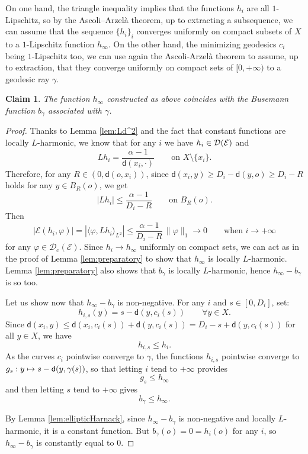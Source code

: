 \documentclass[JEP,XML,SOM,Unicode,published]{cedram}
\newcommand\mto{\mathchoice{\longmapsto}{\mapsto}{\mapsto}{\mapsto}}
\newcommand{\rmc}{\mathrm{c}}
\let\backslash\setminus
\newcommand{\NoChangel}[1]{%
\expandafter\let\csname old\string#1\endcsname=#1
\let#1=\relax
\newcommand{#1}{\mathcode`l="716C\csname old\string#1\endcsname\mathcode`l="7160 }%
}
\theoremstyle{plain}
\newtheorem{claim}[theorem]{Claim}
\theoremstyle{definition}
\newcommand{\cE}{\mathcal{E}}
\newcommand{\cD}{\mathcal{D}}
\let\phi\varphi
\newcommand{\loc}{\mathrm{loc}}\NoChangel{\loc}
\newcommand{\dist}{\mathsf{d}}
\begin{document}
On one hand, the triangle inequality implies that the functions $h_i$ are all $1$-Lipschitz, so by the Ascoli--Arzelà theorem, up to extracting a subsequence, we can assume that the sequence $\{h_i\}_i$ converges uniformly on compact subsets of $X$ to a $1$-Lipschitz function $h_\infty$. On the other hand, the minimizing geodesics $c_i$ being $1$-Lipschitz too, we can use again the Ascoli-Arzelà theorem to assume, up to extraction, that they converge uniformly on compact sets of $[0,+\infty)$ to a geodesic ray $\gamma$.

\begin{claim}\label{claim2}
The function $h_\infty$ constructed as above coincides with the Busemann function $b_\gamma$ associated with $\gamma$.
\end{claim}

\begin{proof}
Thanks to Lemma \ref{lem:Ld^2} and the fact that constant functions are locally $L$-harmonic, we know that for any $i$ we have $h_i \in \cD_{\loc}(\cE)$ and
\[
Lh_i = \frac{\alpha-1}{\dist(x_i,\cdot)} \qquad \text{on $X \backslash \{x_i\}$}.
\]
Therefore, for any $R\in(0,\dist(o,x_i))$, since $\dist(x_i,y)\ge D_i-\dist(y,o)\ge D_i-R$ holds for any $y \in B_R(o)$, we get
\begin{equation}\label{eq:D5.1}
|Lh_i| \le \frac{\alpha-1}{D_i-R} \qquad \text{on $B_R(o)$.}
\end{equation}
Then
\begin{equation}\label{eq:wesh}
|\cE(h_i,\phi)| = |\langle \phi, L h_i\rangle_{L^2}| \le \frac{\alpha-1}{D_i-R}\,\|\phi\|_1 \to 0 \qquad \text{when $i \to +\infty$}
\end{equation}
for any $\phi \in \cD_\rmc(\cE)$. Since $h_i \to h_\infty$ uniformly on compact sets, we can act as in the proof of Lemma \ref{lem:preparatory} to show that $h_\infty$ is locally $L$-harmonic. Lemma \ref{lem:preparatory} also shows that $b_\gamma$ is locally $L$-harmonic, hence $h_\infty - b_\gamma$ is so too.

Let us show now that $h_\infty - b_\gamma$ is non-negative. For any $i$ and $s \in [0,D_i]$, set:
\[
h_{i,s}(y)=s-\dist(y,c_i(s)) \qquad \forall y \in X.
\]
Since $\dist(x_i,y) \le \dist(x_i,c_i(s))+\dist(y,c_i(s))=D_i -s + \dist(y,c_i(s))$ for all $y \in X$, we have
\[
h_{i,s} \le h_i.
\]
As the curves $c_i$ pointwise converge to $\gamma$, the functions $h_{i,s}$ pointwise converge to $g_s:y \mto s - \dist(y,\gamma(s))$, so that letting $i$ tend to $+\infty$ provides
\[
g_s \le h_\infty
\]
and then letting $s$ tend to $+\infty$ gives
\[
b_\gamma \le h_{\infty}.
\]

By Lemma \ref{lem:ellipticHarnack}, since $h_\infty - b_\gamma$ is non-negative and locally $L$-harmonic, it is a constant function. But $b_\gamma(o)=0=h_i(o)$ for any $i$, so $h_\infty - b_\gamma$ is constantly equal to $0$.
\end{proof}
\end{document}
